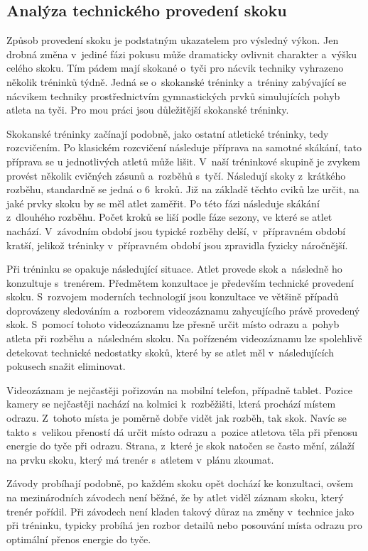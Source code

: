 \subsection{Analýza technického provedení skoku}

Způsob provedení skoku je podstatným ukazatelem pro výsledný výkon. Jen drobná změna v~jediné fázi pokusu může dramaticky ovlivnit charakter a~výšku celého skoku. Tím pádem mají skokané o~tyči pro nácvik techniky vyhrazeno několik tréninků týdně. Jedná se o~skokanské tréninky a~tréniny zabývající se nácvikem techniky prostřednictvím gymnastických prvků simulujících pohyb atleta na tyči. Pro mou práci jsou důležitější skokanské tréninky.

Skokanské tréninky začínají podobně, jako ostatní atletické tréninky, tedy rozcvičením. Po klasickém rozcvičení následuje příprava na samotné skákání, tato příprava se u jednotlivých atletů může lišit. V~naší tréninkové skupině je zvykem provést několik cvičných zásunů a~rozběhů s~tyčí. Následují skoky z~krátkého rozběhu, standardně se jedná o 6~kroků. Již na základě těchto cviků lze určit, na jaké prvky skoku by se měl atlet zaměřit. Po této fázi následuje skákání z~dlouhého rozběhu. Počet kroků se liší podle fáze sezony, ve které se atlet nachází. V~závodním období jsou typické rozběhy delší, v~přípravném období kratší, jelikož tréninky v~přípravném období jsou zpravidla fyzicky náročnější.

Při tréninku se opakuje následující situace. Atlet provede skok a~následně ho konzultuje s~trenérem. Předmětem konzultace je především technické provedení skoku. S~rozvojem moderních technologií jsou konzultace ve většině případů doprovázeny sledováním a~rozborem videozáznamu zahycujícího právě provedený skok. S~pomocí tohoto videozáznamu lze přesně určit místo odrazu a~pohyb atleta při rozběhu a~následném skoku. Na pořízeném videozáznamu lze spolehlivě detekovat technické nedostatky skoků, které by se atlet měl v~následujících pokusech snažit eliminovat.

Videozáznam je nejčastěji pořizován na mobilní telefon, případně tablet. Pozice kamery se nejčastěji nachází na kolmici k~rozběžišti, která prochází místem odrazu. Z~tohoto místa je poměrně dobře vidět jak rozběh, tak skok. Navíc se takto s~velikou přeností dá určit místo odrazu a~pozice atletova těla při přenosu energie do tyče při odrazu. Strana, z~které je skok natočen se často mění, zálaží na prvku skoku, který má trenér s~atletem v~plánu zkoumat.

Závody probíhají podobně, po každém skoku opět dochází ke konzultaci, ovšem na mezinárodních závodech není běžné, že by atlet viděl záznam skoku, který trenér pořídil. Při závodech není kladen takový důraz na změny v~technice jako při tréninku, typicky probíhá jen rozbor detailů nebo posouvání místa odrazu pro optimální přenos energie do tyče.

